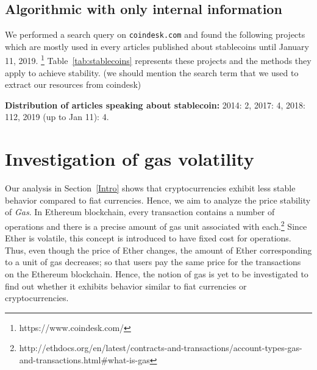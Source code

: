 \subsection{Algorithmic with only internal information}

We performed a search query on \texttt{coindesk.com} and found the following projects which are mostly used in every articles published about stablecoins until January 11, 2019. \footnote{https://www.coindesk.com/} Table~\ref{tab:stablecoins} represents these projects and the methods they apply to achieve stability. (we should mention the search term that we used to extract our resources from coindesk)


\textbf{Distribution of articles speaking about stablecoin:} 2014: 2, 2017: 4, 2018: 112, 2019 (up to Jan 11): 4.



\section{Investigation of gas volatility}


 \par
Our analysis in Section~\ref{Intro} shows that cryptocurrencies exhibit less stable behavior compared to fiat currencies. Hence, we aim to analyze the price stability of \emph{Gas}. In Ethereum blockchain, every transaction contains a number of operations and there is a precise amount of gas unit associated with each.\footnote{http://ethdocs.org/en/latest/contracts-and-transactions/account-types-gas-and-transactions.html\#what-is-gas} Since Ether is volatile, this concept is introduced to have fixed cost for operations. Thus, even though the price of Ether changes, the amount of Ether corresponding to a unit of gas decreases; so that users pay the same price for the transactions on the Ethereum blockchain. Hence, the notion of gas is yet to be investigated to find out whether it exhibits behavior similar to fiat currencies or cryptocurrencies.

